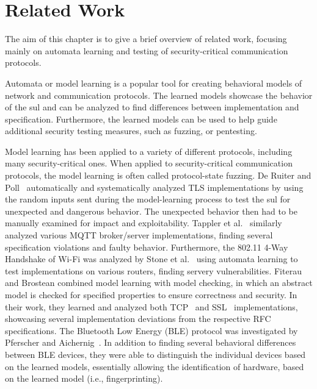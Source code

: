 %
%
% 

\chapter{Related Work}

\label{chap:Related}
The aim of this chapter is to give a brief overview of related work, focusing mainly on automata learning and testing of security-critical communication protocols.

Automata or model learning is a popular tool for creating behavioral models of network and communication protocols. The learned models showcase the behavior of the \ac{sul} and can be analyzed to find differences between implementation and specification. Furthermore, the learned models can be used to help guide additional security testing measures, such as fuzzing, or pentesting. 

Model learning has been applied to a variety of different protocols, including many security-critical ones. When applied to security-critical communication protocols, the model learning is often called protocol-state fuzzing. De Ruiter and Poll~\cite{DBLP:conf/uss/RuiterP15} automatically and systematically analyzed TLS implementations by using the random inputs sent during the model-learning process to test the \ac{sul} for unexpected and dangerous behavior. The unexpected behavior then had to be manually examined for impact and exploitability. Tappler et al.~\cite{tappler2017} similarly analyzed various MQTT broker/server implementations, finding several specification violations and faulty behavior. Furthermore, the 802.11 4-Way Handshake of Wi-Fi was analyzed by Stone et al.~\cite{DBLP:conf/esorics/StoneCR18} using automata learning to test implementations on various routers, finding servery vulnerabilities.
Fiterau and Brostean combined model learning with model checking, in which an abstract model is checked for specified properties to ensure correctness and security. In their work, they learned and analyzed both TCP~\cite{DBLP:conf/cav/Fiterau-Brostean16} and SSL~\cite{DBLP:conf/spin/Fiterau-Brostean17} implementations, showcasing several implementation deviations from the respective RFC specifications.
The Bluetooth Low Energy (BLE) protocol was investigated by Pferscher and Aichernig~\cite{pferscher2021fingerprinting}. In addition to finding several behavioral differences between BLE devices, they were able to distinguish the individual devices based on the learned models, essentially allowing the identification of hardware, based on the learned model (i.e., fingerprinting).

